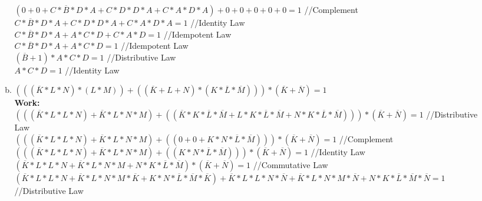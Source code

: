 \documentclass[11pt]{article}
\begin{document}
\begin{enumerate}
\begin{enumerate}[(a)]
            $ (0 + 0 + C * \overline{B} * D * A + C * D * D * A + C * A * D * A) + 0 + 0 + 0 + 0 + 0 = 1$ //Complement\\
            $ C * \overline{B} * D * A + C * D * D * A + C * A * D * A = 1$ //Identity Law\\
            $ C * \overline{B} * D * A + A * C * D + C * A * D= 1$ //Idempotent Law\\
            $ C * \overline{B} * D * A + A * C * D = 1$ //Idempotent Law\\
            $ (\overline{B} + 1) * A * C * D = 1$ //Distributive Law\\
            $ A * C * D = 1$ //Identity Law
            \begin{center}
            \end{center}
        \item $(((\overline{K} * L * N) * (L * M)) + ((\overline{K} + L + N) * (K * \overline{L} * \overline{M}))) * (\overline{K} + \overline{N}) = 1$\\
        \textbf{Work:}\\
            $(((\overline{K} * L * L * N) + \overline{K} * L * N * M) + ((\overline{K} * K * \overline{L} * \overline{M} + L * K * \overline{L} * \overline{M} + N * K * \overline{L} * \overline{M})))*(\overline{K}+\overline{N}) = 1$ //Distributive Law\\
            $(((\overline{K} * L * L * N) + \overline{K} * L * N * M) + ((0 + 0 + K * N * \overline{L} * \overline{M}))) * (\overline{K}+ \overline{N}) = 1$ //Complement\\  
            $(((\overline{K} * L * L * N) + \overline{K} * L * N * M) + ((K * N * \overline{L} * \overline{M}))) * (\overline{K} + \overline{N}) = 1$ //Identity Law\\
            $(\overline{K}* L * L * N + \overline{K} * L * N * M + N * K * \overline{L} * \overline{M}) * (\overline{K} + \overline{N}) = 1$ //Commutative Law\\
            $(\overline{K}* L * L * N + \overline{K} * L * N * M * \overline{K} + K * N * \overline{L} * \overline{M} * \overline{K}) + \overline{K} * L * L * N * \overline{N} + \overline{K} * L * N * M * \overline{N} + N * K * \overline{L} * \overline{M} * \overline{N} = 1$ //Distributive Law\\

\end{enumerate}
\end{enumerate}
\end{document}
